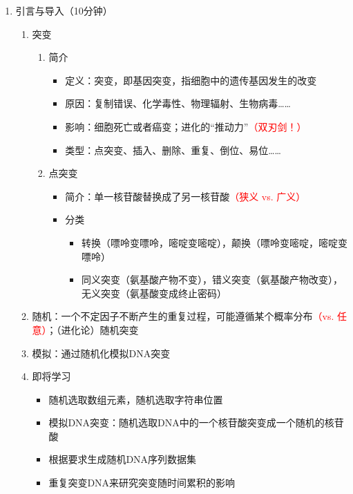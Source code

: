 \documentclass{TIJMUjiaoanLL}
\begin{document}
\firstTail

\newpage
\otherHeader

\begin{enumerate}
  \item 引言与导入（10分钟）
    \begin{enumerate}
      \item 突变
	\begin{enumerate}
	  \item 简介
	    \begin{itemize}
	      \item 定义：突变，即基因突变，指细胞中的遗传基因发生的改变
	      \item 原因：复制错误、化学毒性、物理辐射、生物病毒……
	      \item 影响：细胞死亡或者癌变；进化的“推动力”\textcolor{red}{（双刃剑！）}
	      \item 类型：点突变、插入、删除、重复、倒位、易位……
	    \end{itemize}
	  \item 点突变
	    \begin{itemize}
	      \item 简介：单一核苷酸替换成了另一核苷酸\textcolor{red}{（狭义 vs. 广义）}
	      \item 分类
		\begin{itemize}
		  \item 转换（嘌呤变嘌呤，嘧啶变嘧啶），颠换（嘌呤变嘧啶，嘧啶变嘌呤）
		  \item 同义突变（氨基酸产物不变），错义突变（氨基酸产物改变），无义突变（氨基酸变成终止密码）
		\end{itemize}
	    \end{itemize}
	\end{enumerate}
      \item 随机：一个不定因子不断产生的重复过程，可能遵循某个概率分布\textcolor{red}{（vs. 任意）}；（进化论）随机突变
      \item 模拟：通过随机化模拟DNA突变
      \item 即将学习
	\begin{itemize}
	  \item 随机选取数组元素，随机选取字符串位置
	  \item 模拟DNA突变：随机选取DNA中的一个核苷酸突变成一个随机的核苷酸
	  \item 根据要求生成随机DNA序列数据集
	  \item 重复突变DNA来研究突变随时间累积的影响
	\end{itemize}

\end{enumerate}
\end{enumerate}
\end{document}
